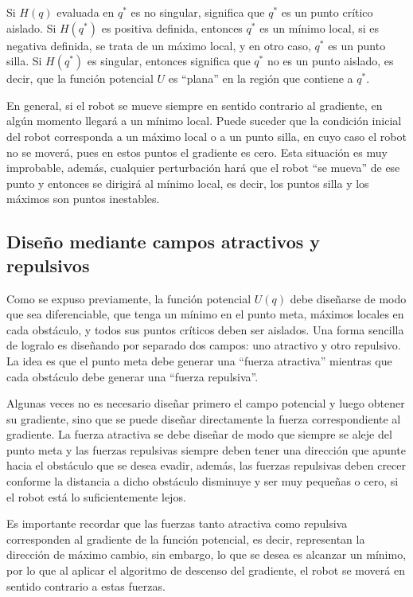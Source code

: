 \documentclass[a4paper]{article}
\begin{document}
Si $H(q)$ evaluada en $q^*$ es no singular, significa que $q^*$ es un punto crítico aislado. Si $H(q^*)$ es positiva definida, entonces $q^*$ es un mínimo local, si es negativa definida, se trata de un máximo local, y en otro caso, $q^*$ es un punto silla. Si $H(q^*)$ es singular, entonces significa que $q^*$ no es un punto aislado, es decir, que la función potencial $U$ es ``plana'' en la región que contiene a $q^*$. 

En general, si el robot se mueve siempre en sentido contrario al gradiente, en algún momento llegará a un mínimo local. Puede suceder que la condición inicial del robot corresponda a un máximo local o a un punto silla, en cuyo caso el robot no se moverá, pues en estos puntos el gradiente es cero. Esta situación es muy improbable, además, cualquier perturbación hará que el robot ``se mueva'' de ese punto y entonces se dirigirá al mínimo local, es decir, los puntos silla y los máximos son puntos inestables. 

\subsection{Diseño mediante campos atractivos y repulsivos}
Como se expuso previamente, la función potencial $U(q)$ debe diseñarse de modo que sea diferenciable, que tenga un mínimo en el punto meta, máximos locales en cada obstáculo, y todos sus puntos críticos deben ser aislados. Una forma sencilla de logralo es diseñando por separado dos campos: uno atractivo y otro repulsivo. La idea es que el punto meta debe generar una ``fuerza atractiva'' mientras que cada obstáculo debe generar una ``fuerza repulsiva''. 

Algunas veces no es necesario diseñar primero el campo potencial y luego obtener su gradiente, sino que se puede diseñar directamente la fuerza correspondiente al gradiente. La fuerza atractiva se debe diseñar de modo que siempre se aleje del punto meta y las fuerzas repulsivas siempre deben tener una dirección que apunte hacia el obstáculo que se desea evadir, además, las fuerzas repulsivas deben crecer conforme la distancia a dicho obstáculo disminuye y ser muy pequeñas o cero, si el robot está lo suficientemente lejos. 

Es importante recordar que las fuerzas tanto atractiva como repulsiva corresponden al gradiente de la función potencial, es decir, representan la dirección de máximo cambio, sin embargo, lo que se desea es alcanzar un mínimo, por lo que al aplicar el algoritmo de descenso del gradiente, el robot se moverá en sentido contrario a estas fuerzas. 
\end{document}

